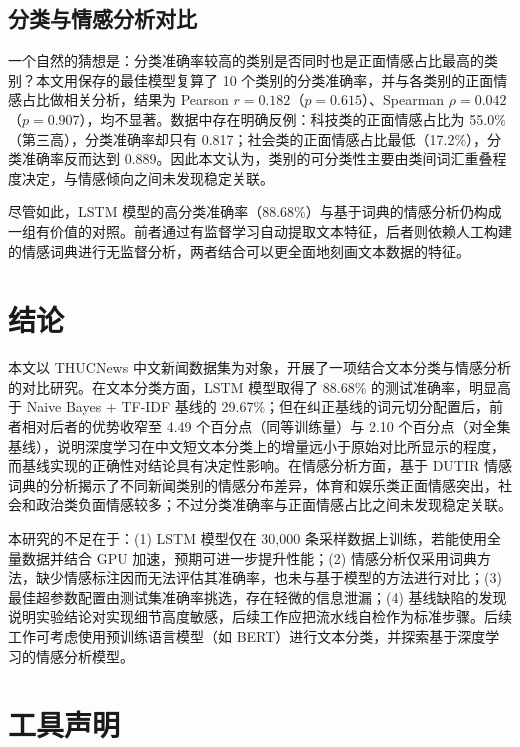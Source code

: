 \documentclass[12pt,a4paper]{article}
\begin{document}
\subsection{分类与情感分析对比}

一个自然的猜想是：分类准确率较高的类别是否同时也是正面情感占比最高的类别？本文用保存的最佳模型复算了 10 个类别的分类准确率，并与各类别的正面情感占比做相关分析，结果为 Pearson $r=0.182$（$p=0.615$）、Spearman $\rho=0.042$（$p=0.907$），均不显著。数据中存在明确反例：科技类的正面情感占比为 55.0\%（第三高），分类准确率却只有 0.817；社会类的正面情感占比最低（17.2\%），分类准确率反而达到 0.889。因此本文认为，类别的可分类性主要由类间词汇重叠程度决定，与情感倾向之间未发现稳定关联。

尽管如此，LSTM 模型的高分类准确率（88.68\%）与基于词典的情感分析仍构成一组有价值的对照。前者通过有监督学习自动提取文本特征，后者则依赖人工构建的情感词典进行无监督分析，两者结合可以更全面地刻画文本数据的特征。

\section{结论}

本文以 THUCNews 中文新闻数据集为对象，开展了一项结合文本分类与情感分析的对比研究。在文本分类方面，LSTM 模型取得了 88.68\% 的测试准确率，明显高于 Naive Bayes + TF-IDF 基线的 29.67\%；但在纠正基线的词元切分配置后，前者相对后者的优势收窄至 4.49 个百分点（同等训练量）与 2.10 个百分点（对全集基线），说明深度学习在中文短文本分类上的增量远小于原始对比所显示的程度，而基线实现的正确性对结论具有决定性影响。在情感分析方面，基于 DUTIR 情感词典的分析揭示了不同新闻类别的情感分布差异，体育和娱乐类正面情感突出，社会和政治类负面情感较多；不过分类准确率与正面情感占比之间未发现稳定关联。

本研究的不足在于：(1) LSTM 模型仅在 30{,}000 条采样数据上训练，若能使用全量数据并结合 GPU 加速，预期可进一步提升性能；(2) 情感分析仅采用词典方法，缺少情感标注因而无法评估其准确率，也未与基于模型的方法进行对比；(3) 最佳超参数配置由测试集准确率挑选，存在轻微的信息泄漏；(4) 基线缺陷的发现说明实验结论对实现细节高度敏感，后续工作应把流水线自检作为标准步骤。后续工作可考虑使用预训练语言模型（如 BERT）进行文本分类，并探索基于深度学习的情感分析模型。

\newpage
\appendix
\renewcommand{\appendixname}{附录}
\section{工具声明}
\end{document}
